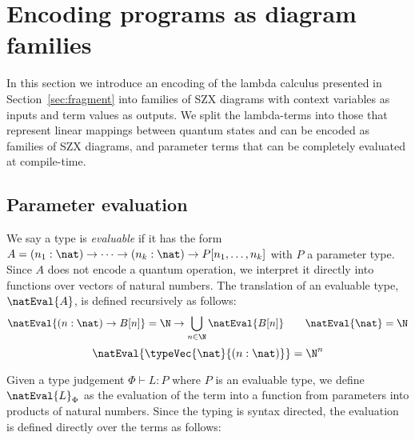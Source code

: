 \section{Encoding programs as diagram families}%
\label{sec:translation}

In this section we introduce an encoding of the lambda calculus presented in Section~\ref{sec:fragment}
into families of SZX diagrams with context variables as inputs and term values as outputs.
We split the lambda-terms into those that represent linear mappings between quantum states
and can be encoded as families of SZX diagrams, and parameter terms that can be completely evaluated
at compile-time.

\subsection{Parameter evaluation}

We say a type is \textit{evaluable} if it has the form
$A = (n_1:\nat) \to \dots \to (n_k:\nat) \to P[n_1,\dots,n_k]$ with $P$ a parameter type.
Since $A$ does not encode a quantum operation,
we interpret it directly into functions over vectors of natural numbers.
The translation of an evaluable type, $\natEval{A}$, is defined recursively as follows:
\[
    \natEval{(n : \nat) \to B[n]} = \N \to \bigcup_{n \in \N} \natEval{B[n]}
    \qquad
    \natEval{\nat} = \N
\]
\[
    \natEval{\typeVec{\nat}{(n : \nat)}} = \N^n
\]

Given a type judgement $\Phi \vdash L : P$ where $P$ is an evaluable type,
we define $\natEval{L}_\Phi$ as the evaluation of the term into a function from parameters into products of natural numbers.
Since the typing is syntax directed, the evaluation is defined directly over the terms as follows:


